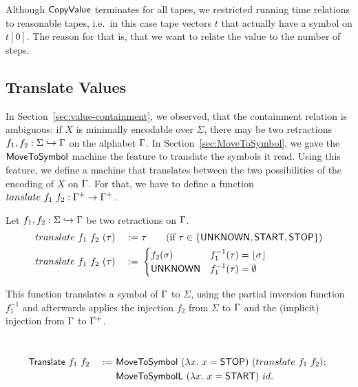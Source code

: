 Although $\mathsf{CopyValue}$ terminates for all tapes, we restricted running time relations to reasonable tapes, i.e.\ in this case tape vectors $t$ that
actually have a symbol on $t[0]$.  The reason for that is, that we want to relate the value to the number of steps.

\subsection{Translate Values}
\label{sec:Translate}

In Section~\ref{sec:value-containment}, we observed, that the containment relation is ambiguous: if $X$ is minimally encodable over $\Sigma$, there
may be two retractions $f_1, f_2 : \Sigma \hookrightarrow \Gamma$ on the alphabet $\Gamma$.  In Section~\ref{sec:MoveToSymbol}, we gave the
$\mathsf{MoveToSymbol}$ machine the feature to translate the symbols it read.  Using this feature, we define a machine that translates between the two
possibilities of the encoding of $X$ on $\Gamma$.  For that, we have to define a function $tanslate~f_1~f_2 : \Gamma^+ \rightarrow \Gamma^+$.

\begin{definition}
  \label{def:translate}
  Let $f_1, f_2 : \Sigma \hookrightarrow \Gamma$ be two retractions on $\Gamma$.
  \begin{alignat*}{2}
    & translate~f_1~f_2~(\tau) &~:=~& \tau \qquad\text{(if $\tau \in \{\mathsf{UNKNOWN}, \mathsf{START}, \mathsf{STOP}\}$)} \\
    & translate~f_1~f_2~(\tau) &~:=~&
    \begin{cases}
      f_2(\sigma)  & f_1^{-1}(\tau) = \left\lfloor {\sigma} \right\rfloor \\
      \mathsf{UNKNOWN} & f_1^{-1}(\tau) = \emptyset
    \end{cases}
  \end{alignat*}
\end{definition}

This function translates a symbol of $\Gamma$ to $\Sigma$, using the partial inversion function $f_1^{-1}$ and afterwards applies the injection $f_2$
from $\Sigma$ to $\Gamma$ and the (implicit) injection from $\Gamma$ to $\Gamma^+$.

\begin{definition}[$\MS{Translate}$][Translate]
  ~
  \begin{alignat*}{2}
    & \mathsf{Translate}~f_1~f_2 &~:=~& \mathsf{MoveToSymbol}~(\lambda x.~x=\mathsf{STOP})~(translate~f_1~f_2) ;~ \\
    &                        &~  ~& \mathsf{MoveToSymbolL}~(\lambda x.~x=\mathsf{START})~id.
  \end{alignat*}
\end{definition}

